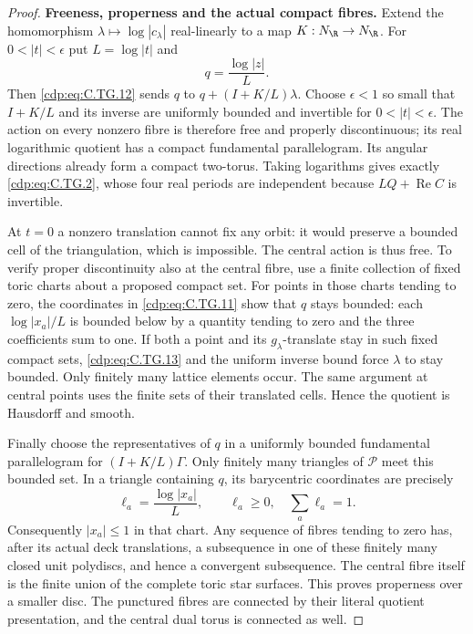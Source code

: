 \begin{proof}
\par\medskip\noindent\textbf{Freeness, properness and the actual compact fibres.}
Extend the homomorphism
$\lambda\mapsto\log|c_\lambda|$ real-linearly
to a map $K:N_{\R}\to N_{\R}$.
For $0<|t|<\epsilon$ put $L=\log|t|$ and
\[
                 q=\frac{\log|z|}{L}.
\tag{C.TG.13}\label{cdp:eq:C.TG.13}
\]
Then \eqref{cdp:eq:C.TG.12} sends $q$ to
$q+(I+K/L)\lambda$.
Choose $\epsilon<1$ so small that $I+K/L$
and its inverse are uniformly bounded and
invertible for $0<|t|<\epsilon$.
The action on every nonzero fibre is
therefore free and properly discontinuous;
its real logarithmic quotient has a compact
fundamental parallelogram. Its angular
directions already form a compact two-torus.
Taking logarithms gives exactly \eqref{cdp:eq:C.TG.2},
whose four real periods are independent
because $LQ+\operatorname{Re}C$ is invertible.

At $t=0$ a nonzero translation cannot fix
any orbit: it would preserve a bounded cell
of the triangulation, which is impossible.
The central action is thus free. To verify
proper discontinuity also at the central
fibre, use a finite collection of fixed
toric charts about a proposed compact set.
For points in those charts tending to zero,
the coordinates in \eqref{cdp:eq:C.TG.11} show that $q$
stays bounded: each $\log|x_a|/L$ is bounded
below by a quantity tending to zero and
the three coefficients sum to one.
If both a point and its $g_\lambda$-translate
stay in such fixed compact sets, \eqref{cdp:eq:C.TG.13}
and the uniform inverse bound force
$\lambda$ to stay bounded. Only finitely
many lattice elements occur. The same
argument at central points uses the finite
sets of their translated cells. Hence the
quotient is Hausdorff and smooth.

Finally choose the representatives of $q$
in a uniformly bounded fundamental
parallelogram for $(I+K/L)\Gamma$.
Only finitely many triangles of
$\mathscr P$ meet this bounded set.
In a triangle containing $q$, its
barycentric coordinates are precisely
\[
             \ell_a=\frac{\log|x_a|}{L},
             \qquad \ell_a\ge0,\quad\sum_a\ell_a=1.
\tag{C.TG.14}\label{cdp:eq:C.TG.14}
\]
Consequently $|x_a|\le1$ in that chart.
Any sequence of fibres tending to zero
has, after its actual deck translations,
a subsequence in one of these finitely
many closed unit polydiscs, and hence a
convergent subsequence. The central fibre
itself is the finite union of the complete
toric star surfaces. This proves properness
over a smaller disc. The punctured fibres
are connected by their literal quotient
presentation, and the central dual torus
is connected as well.


\end{proof}
